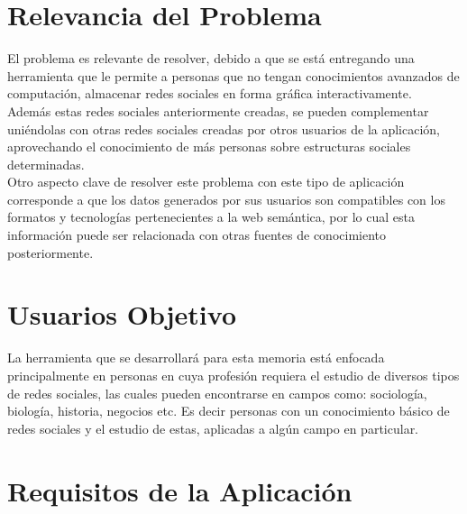 \section{Relevancia del Problema} %
\label{sec:relevancia_del_problema}

El problema es relevante de resolver, debido a que se está entregando una herramienta que le permite a personas que no tengan conocimientos avanzados de computación, almacenar redes sociales en forma gráfica interactivamente.\\

Además estas redes sociales anteriormente creadas, se pueden complementar uniéndolas con otras redes sociales creadas por otros usuarios de la aplicación, aprovechando el conocimiento de más personas sobre estructuras sociales determinadas.\\

Otro aspecto clave de resolver este problema con este tipo de aplicación corresponde a que los datos generados por sus usuarios son compatibles con los formatos y tecnologías pertenecientes a la web semántica, por lo cual esta información puede ser relacionada con otras fuentes de conocimiento posteriormente.



% 
\section{Usuarios Objetivo} %
\label{sec:usuarios_objetivo}

La herramienta que se desarrollará para esta memoria está enfocada principalmente en personas en cuya profesión requiera el estudio de diversos tipos de redes sociales, las cuales pueden encontrarse en campos como: sociología, biología, historia, negocios etc. Es decir personas con un conocimiento básico de redes sociales y el estudio de estas, aplicadas a algún campo en particular.


\section{Requisitos de la Aplicación} %
\label{sec:requisitos_de_la_aplicacion}

% 
% 
% 
% 
% 

